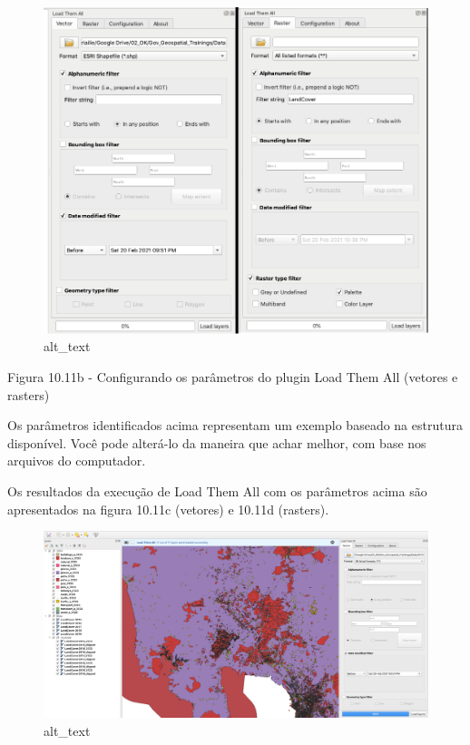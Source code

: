 \documentclass[
]{book}
\begin{document}
\begin{figure}
\centering
\includegraphics{media/modulo10/fig1011_b.png}
\caption{alt\_text}
\end{figure}

Figura 10.11b - Configurando os parâmetros do plugin Load Them All (vetores e rasters)

Os parâmetros identificados acima representam um exemplo baseado na estrutura disponível. Você pode alterá-lo da maneira que achar melhor, com base nos arquivos do computador.

Os resultados da execução de Load Them All com os parâmetros acima são apresentados na figura 10.11c (vetores) e 10.11d (rasters).

\begin{figure}
\centering
\includegraphics{media/modulo10/fig1011_c.png}
\caption{alt\_text}
\end{figure}
\end{document}
